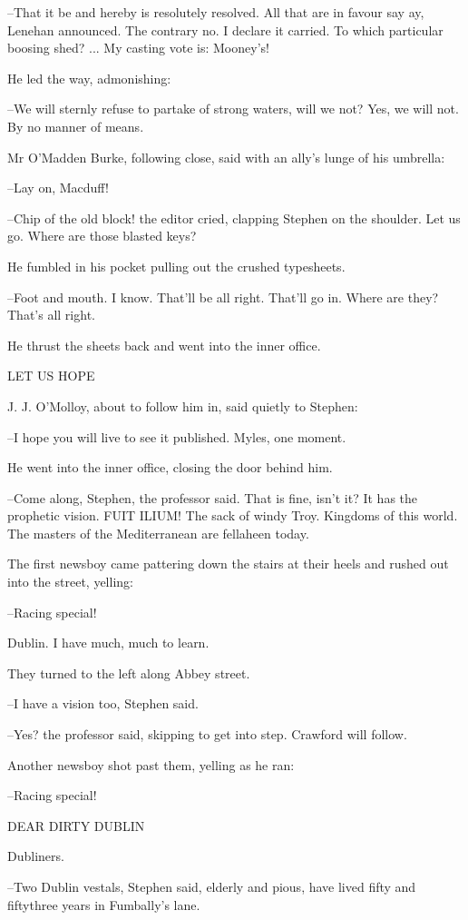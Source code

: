 --That it be and hereby is resolutely resolved. All that are in favour
say ay, Lenehan announced. The contrary no. I declare it carried. To which
particular boosing shed? ... My casting vote is: Mooney's!

He led the way, admonishing:

--We will sternly refuse to partake of strong waters, will we not? Yes,
we will not. By no manner of means.

Mr O'Madden Burke, following close, said with an ally's lunge of his
umbrella:

--Lay on, Macduff!

--Chip of the old block! the editor cried, clapping Stephen on the
shoulder. Let us go. Where are those blasted keys?

He fumbled in his pocket pulling out the crushed typesheets.

--Foot and mouth. I know. That'll be all right. That'll go in. Where are
they? That's all right.

He thrust the sheets back and went into the inner office.


    LET US HOPE


J. J. O'Molloy, about to follow him in, said quietly to Stephen:

--I hope you will live to see it published. Myles, one moment.

He went into the inner office, closing the door behind him.

--Come along, Stephen, the professor said. That is fine, isn't it? It has
the prophetic vision. FUIT ILIUM! The sack of windy Troy. Kingdoms of this
world. The masters of the Mediterranean are fellaheen today.

The first newsboy came pattering down the stairs at their heels and
rushed out into the street, yelling:

--Racing special!

Dublin. I have much, much to learn.

They turned to the left along Abbey street.

--I have a vision too, Stephen said.

--Yes? the professor said, skipping to get into step. Crawford will
follow.

Another newsboy shot past them, yelling as he ran:

--Racing special!


    DEAR DIRTY DUBLIN


Dubliners.

--Two Dublin vestals, Stephen said, elderly and pious, have lived fifty
and fiftythree years in Fumbally's lane.

